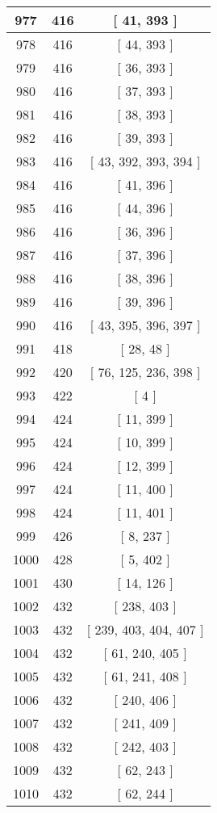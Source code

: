 \begin{center}
\begin{longtable}[H]{|| c c c ||}
977 & 416 & [ 41, 393 ] \\ 
\hline
978 & 416 & [ 44, 393 ] \\ 
\hline
979 & 416 & [ 36, 393 ] \\ 
\hline
980 & 416 & [ 37, 393 ] \\ 
\hline
981 & 416 & [ 38, 393 ] \\ 
\hline
982 & 416 & [ 39, 393 ] \\ 
\hline
983 & 416 & [ 43, 392, 393, 394 ] \\ 
\hline
984 & 416 & [ 41, 396 ] \\ 
\hline
985 & 416 & [ 44, 396 ] \\ 
\hline
986 & 416 & [ 36, 396 ] \\ 
\hline
987 & 416 & [ 37, 396 ] \\ 
\hline
988 & 416 & [ 38, 396 ] \\ 
\hline
989 & 416 & [ 39, 396 ] \\ 
\hline
990 & 416 & [ 43, 395, 396, 397 ] \\ 
\hline
991 & 418 & [ 28, 48 ] \\ 
\hline
992 & 420 & [ 76, 125, 236, 398 ] \\ 
\hline
993 & 422 & [ 4 ] \\ 
\hline
994 & 424 & [ 11, 399 ] \\ 
\hline
995 & 424 & [ 10, 399 ] \\ 
\hline
996 & 424 & [ 12, 399 ] \\ 
\hline
997 & 424 & [ 11, 400 ] \\ 
\hline
998 & 424 & [ 11, 401 ] \\ 
\hline
999 & 426 & [ 8, 237 ] \\ 
\hline
1000 & 428 & [ 5, 402 ] \\ 
\hline
1001 & 430 & [ 14, 126 ] \\ 
\hline
1002 & 432 & [ 238, 403 ] \\ 
\hline
1003 & 432 & [ 239, 403, 404, 407 ] \\ 
\hline
1004 & 432 & [ 61, 240, 405 ] \\ 
\hline
1005 & 432 & [ 61, 241, 408 ] \\ 
\hline
1006 & 432 & [ 240, 406 ] \\ 
\hline
1007 & 432 & [ 241, 409 ] \\ 
\hline
1008 & 432 & [ 242, 403 ] \\ 
\hline
1009 & 432 & [ 62, 243 ] \\ 
\hline
1010 & 432 & [ 62, 244 ] \\ 

\end{longtable}
\end{center}
